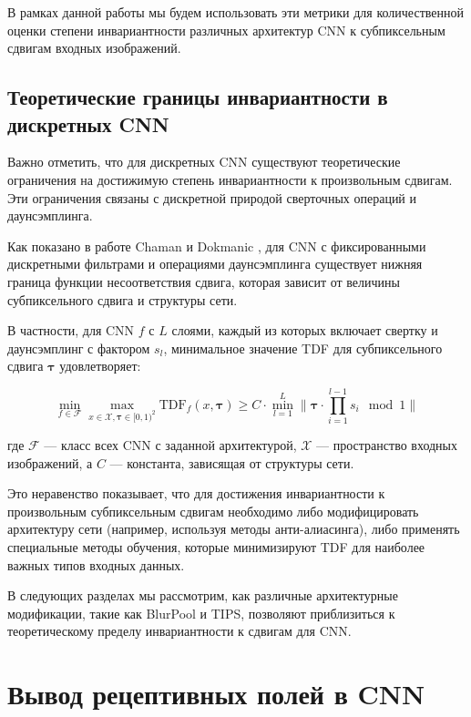 В рамках данной работы мы будем использовать эти метрики для количественной оценки степени инвариантности различных архитектур CNN к субпиксельным сдвигам входных изображений.

\subsection{Теоретические границы инвариантности в дискретных CNN}
\label{theory:formal_definition:theoretical_bounds}

Важно отметить, что для дискретных CNN существуют теоретические ограничения на достижимую степень инвариантности к произвольным сдвигам. Эти ограничения связаны с дискретной природой сверточных операций и даунсэмплинга.

Как показано в работе Chaman и Dokmanic \cite{Chaman2021}, для CNN с фиксированными дискретными фильтрами и операциями даунсэмплинга существует нижняя граница функции несоответствия сдвига, которая зависит от величины субпиксельного сдвига и структуры сети.

В частности, для CNN $f$ с $L$ слоями, каждый из которых включает свертку и даунсэмплинг с фактором $s_l$, минимальное значение TDF для субпиксельного сдвига $\boldsymbol{\tau}$ удовлетворяет:

\begin{equation}
\min_{f \in \mathcal{F}} \max_{x \in \mathcal{X}, \boldsymbol{\tau} \in [0,1)^2} \text{TDF}_f(x, \boldsymbol{\tau}) \geq C \cdot \min_{l=1}^L \|\boldsymbol{\tau} \cdot \prod_{i=1}^{l-1} s_i \mod 1\|
\end{equation}

где $\mathcal{F}$ — класс всех CNN с заданной архитектурой, $\mathcal{X}$ — пространство входных изображений, а $C$ — константа, зависящая от структуры сети.

Это неравенство показывает, что для достижения инвариантности к произвольным субпиксельным сдвигам необходимо либо модифицировать архитектуру сети (например, используя методы анти-алиасинга), либо применять специальные методы обучения, которые минимизируют TDF для наиболее важных типов входных данных.

В следующих разделах мы рассмотрим, как различные архитектурные модификации, такие как BlurPool и TIPS, позволяют приблизиться к теоретическому пределу инвариантности к сдвигам для CNN.

\section{Вывод рецептивных полей в CNN}
\label{theory:receptive_fields}

